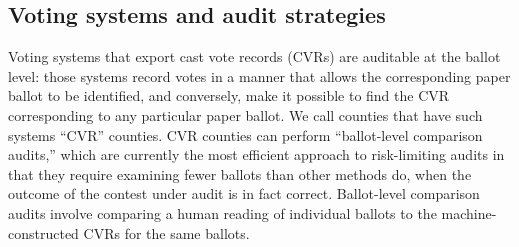 \documentclass[runningheads]{llncs}
\begin{document}
%
\subsection{Voting systems and audit strategies}

Voting systems that export cast vote records (CVRs) are auditable at the ballot level: 
those systems record votes in a manner that allows the corresponding paper ballot to be identified,
and conversely, make it possible to find the CVR corresponding to any
particular paper ballot.
We call counties that have such systems ``CVR'' counties.
CVR counties can perform ``ballot-level comparison audits,'' \cite{lindemanStark12} 
which are currently the most efficient approach to risk-limiting audits in that they require examining fewer
ballots than other methods do, when the outcome of the contest under audit 
is in fact correct.
Ballot-level comparison audits involve comparing a human reading of individual ballots to the machine-constructed CVRs for the same ballots.
\end{document}
